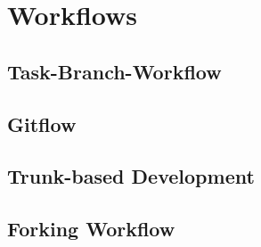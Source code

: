 
\section{Workflows}
\label{sec:workflows}


\subsection{Task-Branch-Workflow}
\label{sec:workflows:task}

\lipsum[1]




\subsection{Gitflow}
\label{sec:workflows:gitflow}

\lipsum[2]




\subsection{Trunk-based Development}
\label{sec:workflows:trunk}

\lipsum[3]




\subsection{Forking Workflow}
\label{sec:workflows:forking}

\lipsum[4]
